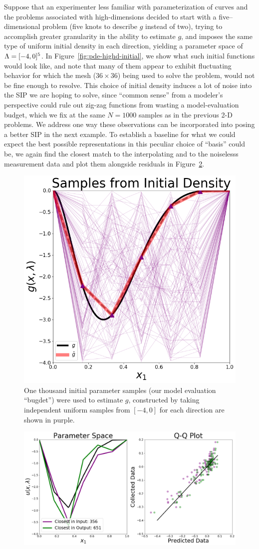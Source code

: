 Suppose that an experimenter less familiar with parameterization of curves and the problems associated with high-dimensions decided to start with a five--dimensional problem (five knots to describe $g$ instead of two), trying to accomplish greater granularity in the ability to estimate $g$, and imposes the same type of uniform initial density in each direction, yielding a parameter space of ${\Lambda} = [-4, 0]^5$.
In Figure~\ref{fig:pde-highd-initial}, we show what such initial functions would look like, and note that many of them appear to exhibit fluctuating behavior for which the mesh ($36\times36$) being used to solve the problem, would not be fine enough to resolve.
This choice of initial density induces a lot of noise into the SIP we are hoping to solve, since ``common sense'' from a modeler's perspective could rule out zig-zag functions from wasting a model-evaluation budget, which we fix at the same $N=1000$ samples as in the previous 2-D problems.
We address one way these observations can be incorporated into posing a better SIP in the next example.
To establish a baseline for what we could expect the best possible representations in this peculiar choice of ``basis'' could be, we again find the closest match to the interpolating and to the noiselesss measurement data and plot them alongside residuals in Figure~\ref{fig:pde-5d-proj}.

\begin{figure}
\centering
  \includegraphics[width=0.475\linewidth]{figures/pde-highd/pde-highd_init_D5.png}
\caption{
One thousand initial parameter samples (our model evaluation ``bugdet'') were used to estimate $g$, constructed by taking independent uniform samples from $[-4, 0]$ for each direction are shown in purple.
}
\label{fig:pde-highd-initial-5d}
\end{figure}


\begin{figure}[htbp]
\centering
  \includegraphics[width=0.675\linewidth]{figures/pde-highd/pde-highd_proj_D5}
\caption{
}
\label{fig:pde-5d-proj}
\end{figure}

